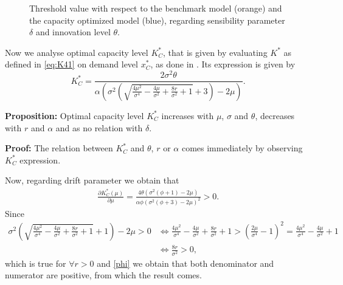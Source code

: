 \begin{figure}[!htb]
	\begin{subfigmatrix}{2}
	\end{subfigmatrix}
\caption{Threshold value with respect to the benchmark model (orange) and the capacity optimized model (blue), regarding sensibility parameter $\delta$ and innovation level $\theta$.}
\label{fig:td}
\end{figure}





Now we analyse optimal capacity level $K^*_C$, that is given by evaluating $K^*$ as defined in \eqref{eq:K41} on demand level $x^*_C$, as done in \cite{huis:cap}. Its expression is given by
$$K^*_C=\frac{2 \sigma ^2 \theta}{\alpha \left(\sigma ^2 \left(\sqrt{\frac{4 \mu ^2}{\sigma ^4}-\frac{4 \mu }{\sigma ^2}+\frac{8 r}{\sigma ^2}+1}+3\right)-2 \mu \right)}.$$

\textbf{Proposition:}
Optimal capacity level $K^*_C$ increases with $\mu$, $\sigma$ and $\theta$, decreases with $r$ and $\alpha$ and as no relation with $\delta$.

\textbf{Proof:}
The relation between $K^*_C$ and $\theta$, $r$ or $\alpha$ comes immediately by observing $K^*_C$ expression.

Now, regarding drift parameter we obtain that
 \begin{align*}
\frac{\partial K^*_C(\mu)}{\partial \mu}=
\frac{4 \theta \left(\sigma ^2 \left(\phi+1\right)-2 \mu \right)}{\alpha \phi \left(\sigma ^2 \left(\phi+3\right)-2 \mu \right)^2}>0.
\end{align*}
Since
\begin{align}
\label{cond2}
\sigma ^2 \left(\sqrt{\frac{4 \mu ^2}{\sigma ^4}-\frac{4 \mu }{\sigma ^2}+\frac{8 r}{\sigma ^2}+1}+1\right)-2 \mu>0 
& \Leftrightarrow
\frac{4 \mu ^2}{\sigma ^4}-\frac{4 \mu }{\sigma ^2}+\frac{8 r}{\sigma ^2}+1 > \left( \frac{2 \mu}{\sigma^4}-1 \right)^2=\frac{4 \mu ^2}{\sigma ^4}-\frac{4 \mu }{\sigma ^2}+1 \\
& \Leftrightarrow
\frac{8 r}{\sigma ^2}>0, \nonumber
\end{align}
which is true for $\forall r> 0$ and \eqref{phi} we obtain that both denominator and numerator are positive, from which the result comes.

